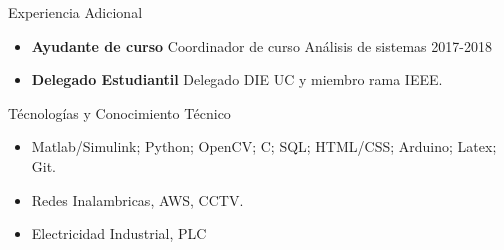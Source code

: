 \documentclass[]{mcdowellcv}
\begin{document}
	\begin{cvsection}{Experiencia Adicional}
		\begin{cvsubsection}{}{}{}	
			\begin{itemize}
				\item \textbf{Ayudante de curso} Coordinador de curso Análisis de sistemas 2017-2018
				\item \textbf{Delegado Estudiantil} Delegado DIE UC y miembro rama IEEE.
			\end{itemize}
		\end{cvsubsection}
	\end{cvsection}
	
	\begin{cvsection}{Técnologías y Conocimiento Técnico}
		\begin{cvsubsection}{}{}{}	
			\begin{itemize}
				\item Matlab/Simulink; Python; OpenCV; C; SQL; HTML/CSS; Arduino; Latex; Git.
				\item Redes Inalambricas, AWS, CCTV.
				\item Electricidad Industrial, PLC
			\end{itemize}
		\end{cvsubsection}
	\end{cvsection}
	
\end{document}
